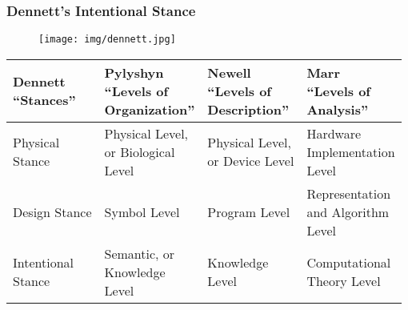 \documentclass[UTF8,11pt,colorlinks,compress,openany]{beamer}%
\begin{document}
\begin{frame}\frametitle{Dennett's Intentional Stance}
\begin{figure}[H]
\texttt{[image: img/dennett.jpg]}
\end{figure}
\begin{table}
\begin{tabular}{p{}|p{}|p{}|p{}}
\hline
\tabincell{l}{Dennett\\``Stances''} & \tabincell{l}{Pylyshyn\\``Levels of\\ Organization''} & \tabincell{l}{Newell\\``Levels of\\ Description''} & \tabincell{l}{Marr\\``Levels of\\ Analysis''} \\
\hline
\tabincell{l}{Physical\\ Stance} & \tabincell{l}{Physical Level,\\ or Biological\\ Level} & \tabincell{l}{Physical Level,\\ or Device Level} & \tabincell{l}{Hardware\\ Implementation\\ Level} \\
\hline
Design Stance & Symbol Level & Program Level & \tabincell{l}{Representation\\ and Algorithm\\ Level} \\
\hline
\tabincell{l}{Intentional\\ Stance} & \tabincell{l}{Semantic, or\\ Knowledge\\ Level} & \tabincell{l}{Knowledge\\ Level} & \tabincell{l}{Computational\\ Theory Level} \\
\hline
\end{tabular}
\end{table}
\end{frame}
\end{document}
